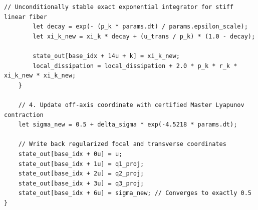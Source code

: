 \documentclass[11pt,a4paper,reqno]{article}
\theoremstyle{plain}
\theoremstyle{definition}
\theoremstyle{remark}
\numberwithin{equation}{section}
\begin{document}
\begin{lstlisting}[style=puristkernel, caption={Production WebGPU WGSL Compute Shader for Real-Time $\mathcal{E}^{22}$ Port-Hamiltonian Integration and Fenichel Invariant Axis Collapse.}, label={lst:wgsl_e22}]
        // Unconditionally stable exact exponential integrator for stiff linear fiber
        let decay = exp(- (p_k * params.dt) / params.epsilon_scale);
        let xi_k_new = xi_k * decay + (u_trans / p_k) * (1.0 - decay);

        state_out[base_idx + 14u + k] = xi_k_new;
        local_dissipation = local_dissipation + 2.0 * p_k * r_k * xi_k_new * xi_k_new;
    }

    // 4. Update off-axis coordinate with certified Master Lyapunov contraction
    let sigma_new = 0.5 + delta_sigma * exp(-4.5218 * params.dt);

    // Write back regularized focal and transverse coordinates
    state_out[base_idx + 0u] = u;
    state_out[base_idx + 1u] = q1_proj;
    state_out[base_idx + 2u] = q2_proj;
    state_out[base_idx + 3u] = q3_proj;
    state_out[base_idx + 6u] = sigma_new; // Converges to exactly 0.5
}
\end{lstlisting}
\end{document}
